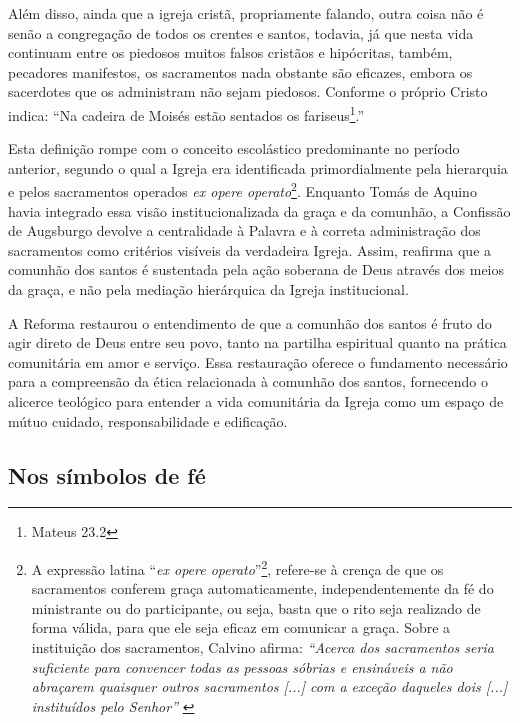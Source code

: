 \begin{citacao}
    Além disso, ainda que a igreja cristã, propriamente falando, outra coisa não é senão a congregação de todos os crentes e santos, todavia, já que nesta vida continuam entre os piedosos muitos falsos cristãos e hipócritas, também, pecadores manifestos, os sacramentos nada obstante são eficazes, embora os sacerdotes que os administram não sejam piedosos. Conforme o próprio Cristo indica: ``Na cadeira de Moisés estão sentados os fariseus\footnote{Mateus 23.2}.''\cite[Artigo~VII, p.~32]{livroConcordia}
\end{citacao}

Esta definição rompe com o conceito escolástico predominante no período anterior, segundo o qual a Igreja era identificada primordialmente pela hierarquia e pelos sacramentos operados \textit{\foreignlanguage{latin}{ex opere operato}}\footnote{A expressão latina ``\textit{\foreignlanguage{latin}{ex opere operato}}''\footnote{Tradução nossa: obra realizada}, refere-se à crença de que os sacramentos conferem graça automaticamente, independentemente da fé do ministrante ou do participante, ou seja, basta que o rito seja realizado de forma válida, para que ele seja eficaz em comunicar a graça. Sobre a instituição dos sacramentos, Calvino afirma: \textit{``Acerca dos sacramentos seria suficiente para convencer todas as pessoas sóbrias e ensináveis a não abraçarem quaisquer outros sacramentos [...] com a exceção daqueles dois [...] instituídos pelo Senhor''} \cite[v.~4, Capítulo~XIX, p.~2605]{calvino2022}}. Enquanto Tomás de Aquino havia integrado essa visão institucionalizada da graça e da comunhão, a Confissão de Augsburgo devolve a centralidade à Palavra e à correta administração dos sacramentos como critérios visíveis da verdadeira Igreja. Assim, reafirma que a comunhão dos santos é sustentada pela ação soberana de Deus através dos meios da graça, e não pela mediação hierárquica da Igreja institucional.

A Reforma restaurou o entendimento de que a comunhão dos santos é fruto do agir direto de Deus entre seu povo, tanto na partilha espiritual quanto na prática comunitária em amor e serviço. Essa restauração oferece o fundamento necessário para a compreensão da ética relacionada à comunhão dos santos, fornecendo o alicerce teológico para entender a vida comunitária da Igreja como um espaço de mútuo cuidado, responsabilidade e edificação.

\subsection{Nos símbolos de fé}

